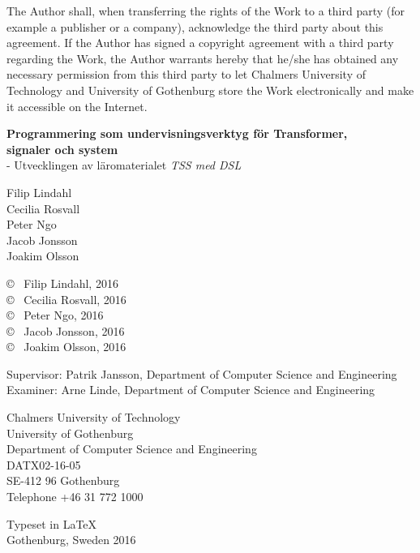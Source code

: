 The Author shall, when transferring the rights of the Work to a third
party (for example a publisher or a company), acknowledge the third
party about this agreement. If the Author has signed a copyright
agreement with a third party regarding the Work, the Author warrants
hereby that he/she has obtained any necessary permission from this
third party to let Chalmers University of Technology and University of
Gothenburg store the Work electronically and make it accessible on the
Internet.

\vspace{1.5cm}

\textbf{Programmering som undervisningsverktyg för Transformer, \\ signaler och system} \\
- Utvecklingen av läromaterialet \textit{TSS med DSL}


\vspace{1cm}

Filip Lindahl   \\
Cecilia Rosvall \\
Peter Ngo       \\
Jacob Jonsson   \\
Joakim Olsson

\copyright ~ Filip Lindahl, 2016  \\
\copyright ~ Cecilia Rosvall, 2016\\
\copyright ~ Peter Ngo, 2016      \\
\copyright ~ Jacob Jonsson, 2016  \\
\copyright ~ Joakim Olsson, 2016
\vspace{0.5cm}

Supervisor: Patrik Jansson, Department of Computer Science and Engineering \\
Examiner: Arne Linde, Department of Computer Science and Engineering
\vspace{0.5cm}

Chalmers University of Technology\\
University of Gothenburg \\
Department of Computer Science and Engineering \\
DATX02-16-05 \\
SE-412 96 Gothenburg\\
Telephone +46 31 772 1000 \setlength{\parskip}{0.5cm}

\vfill
Typeset in \LaTeX \\
Gothenburg, Sweden 2016
